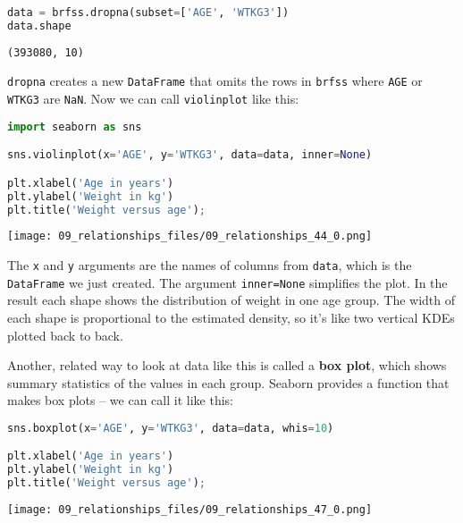 \begin{lstlisting}[language=Python,style=source]
data = brfss.dropna(subset=['AGE', 'WTKG3'])
data.shape
\end{lstlisting}

\begin{lstlisting}[style=output]
(393080, 10)
\end{lstlisting}

\passthrough{\lstinline!dropna!} creates a new
\passthrough{\lstinline!DataFrame!} that omits the rows in
\passthrough{\lstinline!brfss!} where \passthrough{\lstinline!AGE!} or
\passthrough{\lstinline!WTKG3!} are \passthrough{\lstinline!NaN!}. Now
we can call \passthrough{\lstinline!violinplot!} like this:

\begin{lstlisting}[language=Python,style=source]
import seaborn as sns

sns.violinplot(x='AGE', y='WTKG3', data=data, inner=None)

plt.xlabel('Age in years')
plt.ylabel('Weight in kg')
plt.title('Weight versus age');
\end{lstlisting}

\begin{center}
\texttt{[image: 09\_relationships\_files/09\_relationships\_44\_0.png]}
\end{center}

The \passthrough{\lstinline!x!} and \passthrough{\lstinline!y!}
arguments are the names of columns from \passthrough{\lstinline!data!},
which is the \passthrough{\lstinline!DataFrame!} we just created. The
argument \passthrough{\lstinline!inner=None!} simplifies the plot. In
the result each shape shows the distribution of weight in one age group.
The width of each shape is proportional to the estimated density, so
it's like two vertical KDEs plotted back to back.

Another, related way to look at data like this is called a \textbf{box
plot}, which shows summary statistics of the values in each group.
Seaborn provides a function that makes box plots -- we can call it like
this:

\begin{lstlisting}[language=Python,style=source]
sns.boxplot(x='AGE', y='WTKG3', data=data, whis=10)

plt.xlabel('Age in years')
plt.ylabel('Weight in kg')
plt.title('Weight versus age');
\end{lstlisting}

\begin{center}
\texttt{[image: 09\_relationships\_files/09\_relationships\_47\_0.png]}
\end{center}

